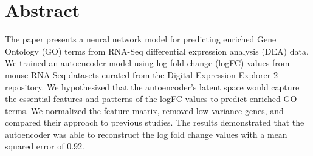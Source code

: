 
\section*{Abstract}

The paper presents a neural network model for predicting enriched Gene Ontology (GO)
terms from RNA-Seq differential expression analysis (DEA) data. We trained an
autoencoder model using log fold change (logFC) values from mouse RNA-Seq datasets
curated from the Digital Expression Explorer 2 repository. We hypothesized that the
autoencoder's latent space would capture the essential features and patterns of the
logFC values to predict enriched GO terms. We normalized the feature matrix,
removed low-variance genes, and compared their approach to previous studies. The results
demonstrated that the autoencoder was able to reconstruct the log fold change values
with a mean squared error of 0.92.
